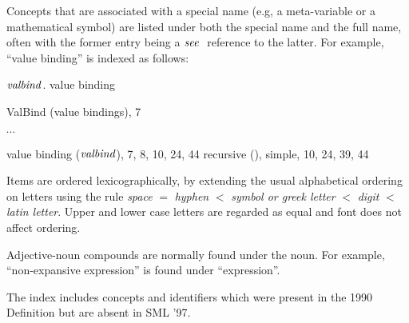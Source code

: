 \begin{theindex}
\thispagestyle{empty}
Concepts
 that are associated with a
special name (e.g, a meta-variable or a mathematical symbol)
are listed under both the special name and the full name,
often with the former entry being a ${\it see\ }$ reference to the latter.
For example, ``value binding'' is indexed as follows:
\indexspace

\item ${\it valbind}$. \see value binding
\item ValBind (value bindings), 7
\item $\cdots$
\item value binding (${\it valbind}$), 7, 8, 10, 24, 44
\subitem recursive (), \recrefs 
\subitem simple, 10, 24, 39, 44
\indexspace

Items are ordered lexicographically, by extending the 
usual alphabetical ordering on letters using the rule
{\it space} $=$ {\it hyphen} $<$ {\it symbol or greek letter}  $<$ {\it digit} $<$ {\it latin letter}.
Upper and lower case letters are regarded as equal and font does not affect
ordering.

Adjective-noun compounds are normally found under the noun. For example,
``non-expansive expression'' is found under ``expression''.

The index includes concepts and identifiers
which were present in the 1990 Definition but are absent in SML '97.

\indexspace


\end{theindex}

